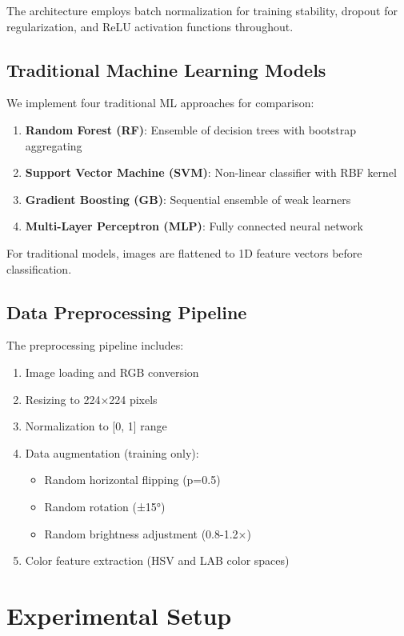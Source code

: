 \documentclass[runningheads]{llncs}
\begin{document}
The architecture employs batch normalization for training stability, dropout for regularization, and ReLU activation functions throughout.

\subsection{Traditional Machine Learning Models}

We implement four traditional ML approaches for comparison:

\begin{enumerate}
    \item \textbf{Random Forest (RF)}: Ensemble of decision trees with bootstrap aggregating
    \item \textbf{Support Vector Machine (SVM)}: Non-linear classifier with RBF kernel
    \item \textbf{Gradient Boosting (GB)}: Sequential ensemble of weak learners
    \item \textbf{Multi-Layer Perceptron (MLP)}: Fully connected neural network
\end{enumerate}

For traditional models, images are flattened to 1D feature vectors before classification.

\subsection{Data Preprocessing Pipeline}

The preprocessing pipeline includes:

\begin{enumerate}
    \item Image loading and RGB conversion
    \item Resizing to 224×224 pixels
    \item Normalization to [0, 1] range
    \item Data augmentation (training only):
    \begin{itemize}
        \item Random horizontal flipping (p=0.5)
        \item Random rotation (±15°)
        \item Random brightness adjustment (0.8-1.2×)
    \end{itemize}
    \item Color feature extraction (HSV and LAB color spaces)
\end{enumerate}

\section{Experimental Setup}
\end{document}
